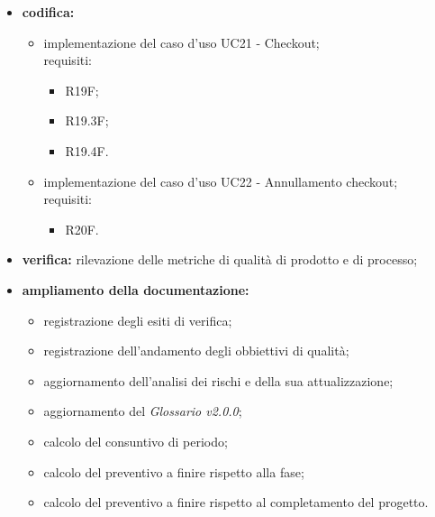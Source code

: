 \begin{itemize}
    \item \textbf{codifica:}
          \begin{itemize}
              \item implementazione del caso d'uso UC21 - Checkout;\\ requisiti:
                    \begin{itemize}
                        \item R19F;
                        \item R19.3F;
                        \item R19.4F.
                    \end{itemize}
              \item implementazione del caso d'uso UC22 - Annullamento checkout;\\ requisiti:
                    \begin{itemize}
                        \item R20F.
                    \end{itemize}
          \end{itemize}
    \item \textbf{verifica:} rilevazione delle metriche di qualità di prodotto e di processo;
    \item \textbf{ampliamento della documentazione:}
          \begin{itemize}
              \item registrazione degli esiti di verifica;
              \item registrazione dell'andamento degli obbiettivi di qualità;
              \item aggiornamento dell'analisi dei rischi e della sua attualizzazione;
              \item aggiornamento del \textit{Glossario v2.0.0};
              \item calcolo del consuntivo di periodo;
              \item calcolo del preventivo a finire rispetto alla fase;
              \item calcolo del preventivo a finire rispetto al completamento del progetto.
          \end{itemize}
\end{itemize}
